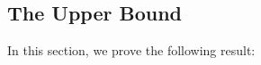\documentclass{patmorin}
\DeclareMathOperator{\crs}{cr}
\begin{document}
%
%
%
%
%
%

\subsection{The Upper Bound}

In this section, we prove the following result:
\end{document}
